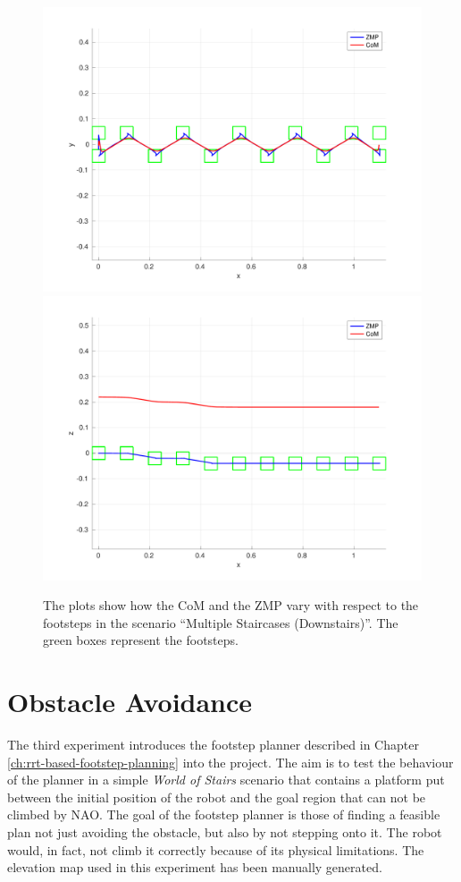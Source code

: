 \begin{figure}
  \centering
  \includegraphics[width=\textwidth]
      {figures/experiments/multiple-staircases/downstairs/xy-plot-2cm.pdf}
  \includegraphics[width=\textwidth]
      {figures/experiments/multiple-staircases/downstairs/xz-plot-2cm.pdf}
  \caption{The plots show how the CoM and the ZMP vary with respect to the
		footsteps in the scenario ``Multiple Staircases (Downstairs)''.
    The green boxes represent the footsteps.}
  \label{fig:experiments:multiple-staircases:downstairs:comzmp}
\end{figure}

\section{Obstacle Avoidance}
The third experiment introduces the footstep planner described in Chapter
\ref{ch:rrt-based-footstep-planning} into 
the project. The aim is to test the behaviour of the planner in a simple 
\textit{World of Stairs} scenario that contains a platform put between the
initial position of the robot and the goal region that can not be climbed by 
NAO. The goal of the footstep planner is those of finding a feasible 
plan not just avoiding the obstacle, but also by not stepping onto it. 
The robot would, in fact, not climb it correctly because of its
physical limitations.
The elevation map used in this experiment has been manually generated.

